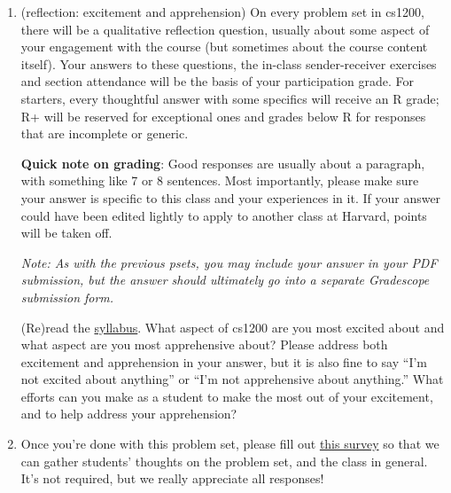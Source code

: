 \documentclass[11pt]{article}
\begin{document}
\begin{enumerate}
\begin{enumerate}
\begin{enumerate}
        \item $f(n) = \left| \{S \subseteq [n] : |S|\leq 5\}\right|,$ where $[n]=\{0,1,2,\ldots,n-1\}$, and $g(n)=3n^3$.

        \item $f(n) = 5^n$, $g(n)=n!$.

    \item Prove or disprove: For all functions $f,g : \N\rightarrow \R^+,$ $f=O(g) \Rightarrow \big(g= o(f)$ OR $f=o(g)\big)$.
    \end{enumerate}

\end{enumerate}

\item (reflection: excitement and apprehension) On every problem set in cs1200, there will be a qualitative reflection question, usually about some aspect of your engagement with the course (but sometimes about the course content itself). Your answers to these questions, the in-class sender-receiver exercises and section attendance will be the basis of your participation grade.  For starters, every thoughtful answer with some specifics will receive an R grade; R+ will be reserved for exceptional ones and grades below R for responses that are incomplete or generic.

\textbf{Quick note on grading}: Good responses are usually about a paragraph, with something like 7 or 8 sentences. Most importantly, please make sure your answer is specific to this class and your experiences in it. If your answer could have been edited lightly to apply to another class at Harvard, points will be taken off.

\textit{Note: As with the previous psets, you may include your answer in your PDF submission, but the answer should ultimately go into a separate Gradescope submission form.}

(Re)read the \href{https://github.com/Harvard-CS-1200/cs1200/blob/gh-pages/fall%202026/Fall%202026%20CS%201200%20Syllabus.pdf}{syllabus}.  What aspect of cs1200 are you most excited about and what aspect are you most apprehensive about? Please address both excitement and apprehension in your answer, but it is also fine to say “I’m not excited about anything” or “I’m not apprehensive about anything.” What efforts can you make as a student to make the most out of your excitement, and to help address your apprehension?

\item Once you're done with this problem set, please fill out \href{https://forms.gle/QrqYKk1VaGbZRvxTA}{this survey} so that we can gather students' thoughts on the problem set, and the class in general. It's not required, but we really appreciate all responses!
\end{enumerate}
\end{document}
